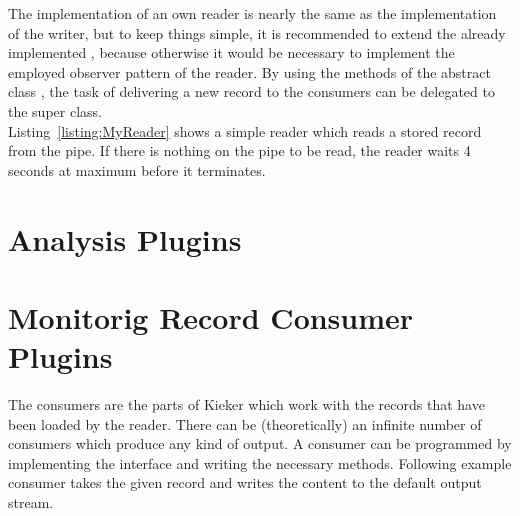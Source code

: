 \noindent The implementation of an own reader is nearly the same as the implementation of the writer, but to keep things simple, it is recommended to extend the already implemented , because otherwise it would be necessary to implement the employed observer pattern of the reader. By using the methods of the abstract class , the task of delivering a new record to the consumers can be delegated to the super class.\\
Listing~\ref{listing:MyReader} shows a simple reader which reads a stored record from the pipe. If there is nothing on the pipe to be read, the reader waits 4 seconds at maximum before it terminates.

\setJavaCodeListing


\section{Analysis Plugins}\label{sec:analysis:plugins}


\section{Monitorig Record Consumer Plugins}\label{sec:analysis:consumer}

The consumers are the parts of Kieker which work with the records that have been loaded by the reader. There can be (theoretically) an infinite number of consumers which produce any kind of output. A consumer can be programmed by implementing the interface  and writing the necessary methods. Following example consumer takes the given record and writes the content to the default output stream.

\setJavaCodeListing


